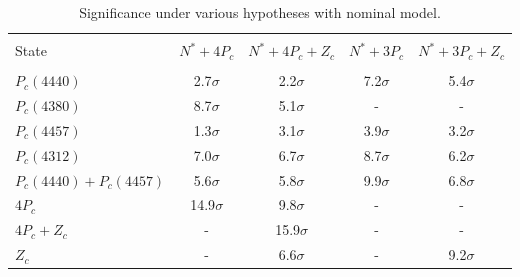 \begin{table}[htb]
\centering
\caption{ Significance under various hypotheses with nominal model. }
\label{tab:sig_nor}
\vspace{0.2cm}
\begin{tabular}{ l|c|c|c|c }
\hline\\[-2.5ex]
 State                   & $N^*+4P_c$   & $N^*+4P_c+Z_c$  & $N^*+3P_c$   & $N^*+3P_c+Z_c$  \\
 \hline \\[-2.5ex]
 $P_c(4440)$             & 2.7$\sigma$  & 2.2$\sigma$  & 7.2$\sigma$  & 5.4$\sigma$     \\
 $P_c(4380)$             & 8.7$\sigma$  & 5.1$\sigma$  & -            & -               \\
 $P_c(4457)$             & 1.3$\sigma$  & 3.1$\sigma$  & 3.9$\sigma$  & 3.2$\sigma$     \\
 $P_c(4312)$             & 7.0$\sigma$  & 6.7$\sigma$  & 8.7$\sigma$  & 6.2$\sigma$     \\
 $P_c(4440)+P_c(4457)$   & 5.6$\sigma$  & 5.8$\sigma$  & 9.9$\sigma$  & 6.8$\sigma$     \\
 $4P_c$                  & 14.9$\sigma$ & 9.8$\sigma$  & -            & -               \\
 $4P_c+Z_c$              & -            & 15.9$\sigma$ & -            & -     \\
 $Z_c$                   & -            & 6.6$\sigma$  & -            & 9.2$\sigma$     \\
\hline
\end{tabular}
\end{table}




